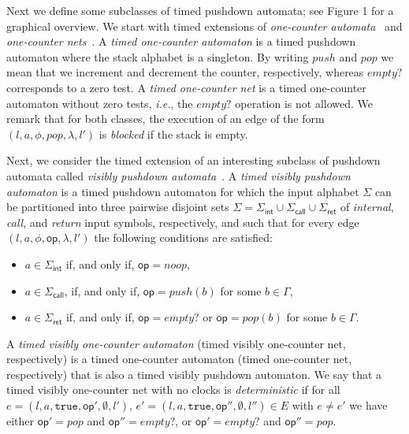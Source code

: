 \documentclass{CSML}
\theoremstyle{plain}\newtheorem{theorem}[thm]{Theorem}
\theoremstyle{plain}\newtheorem{corollary}[thm]{Corollary}
\theoremstyle{plain}\newtheorem{example}[thm]{Example}
\theoremstyle{plain}\newtheorem{lemma}[thm]{Lemma}
\theoremstyle{plain}\newtheorem{remark}[thm]{Remark}
\newcommand{\edges}{E}
\newcommand{\loc}{\mathit{l}}
\newcommand{\true}{\mathtt{true}}
\newcommand*\ie{\textit{i.e.}}
\newcommand{\op}{\mathsf{op}}
\begin{document}
Next we define some subclasses of timed pushdown automata; see Figure 1 for a graphical overview.
We start with timed extensions of \emph{one-counter automata}~\cite{DLS-tcs10,DBLP:journals/iandc/JancarKMS04} and \emph{one-counter nets}~\cite{DBLP:conf/fsttcs/HofmanLMT13,DBLP:conf/concur/AbdullaC98}. 
A \emph{timed one-counter automaton} is a timed pushdown automaton where the stack alphabet is a singleton. 
By writing $push$ and $pop$ we mean that we increment and decrement the counter, respectively, whereas $empty?$ corresponds to a zero test.  
A \emph{timed one-counter net} is a timed one-counter automaton without zero tests, \ie, the $empty?$ operation is not allowed.
We remark that for both classes, the execution of an edge of the form $(\loc,a,\phi,pop,\lambda,\loc')$ is \emph{blocked} if the stack is empty. 


Next, we consider the timed extension of an interesting subclass of pushdown automata called \emph{visibly pushdown automata}~\cite{DBLP:conf/stoc/AlurM04}. 
A \emph{timed visibly pushdown automaton}
is a timed pushdown automaton for which the input alphabet $\Sigma$ can be partitioned into three pairwise disjoint sets $\Sigma=\Sigma_{\mathsf{int}}\cup\Sigma_{\mathsf{call}}\cup\Sigma_{\mathsf{ret}}$ of \emph{internal}, \emph{call}, and \emph{return} input symbols, respectively, and such that
for every edge $(\loc,a,\phi,\op,\lambda,\loc')$
the following conditions are satisfied:
\begin{itemize}
\item $a\in\Sigma_{\mathsf{int}}$ if, and only if,  $\op=noop$,
\item $a\in\Sigma_{\mathsf{call}}$, if, and only if,  $\op=push(b)$ for some $b\in\Gamma$,
\item $a\in\Sigma_{\mathsf{ret}}$ if, and only if,  $\op=empty?$ or $\op=pop(b)$ for some $b\in\Gamma$. 	
\end{itemize}
A \emph{timed visibly one-counter automaton} (timed visibly one-counter net, respectively) is a timed one-counter automaton (timed one-counter net, respectively) that is also a timed visibly pushdown automaton.
We say that a timed visibly one-counter net with no clocks is \emph{deterministic} if 
for all $e=(\loc,a,\true,\op',\emptyset,\loc')$, $e'=(\loc,a,\true,\op'',\emptyset,\loc'')\in \edges$  with $e\neq e'$ we  have either $\op'=pop$ and $\op''=empty?$, or
$\op'=empty?$ and $\op''=pop$. 
\end{document}
